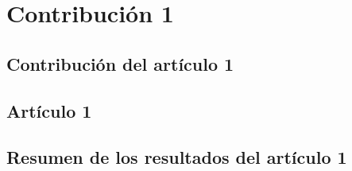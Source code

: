 \chapter{Contribución 1}
\label{cha:contribucion-1}

\section{Contribución del artículo 1}
\label{sec:contribucion-articulo-1}

\section{Artículo 1}
\label{sec:articulo-1}

\section{Resumen de los resultados del artículo 1}
\label{sec:resumen-resultados-articulo-1}